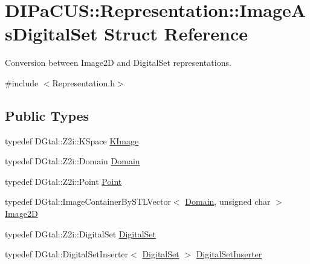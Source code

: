 \hypertarget{structDIPaCUS_1_1Representation_1_1ImageAsDigitalSet}{}\section{D\+I\+Pa\+C\+US\+:\+:Representation\+:\+:Image\+As\+Digital\+Set Struct Reference}
\label{structDIPaCUS_1_1Representation_1_1ImageAsDigitalSet}


Conversion between Image2D and Digital\+Set representations.  




{\ttfamily \#include $<$Representation.\+h$>$}

\subsection*{Public Types}
\begin{DoxyCompactItemize}
\item 
typedef D\+Gtal\+::\+Z2i\+::\+K\+Space \mbox{\hyperlink{structDIPaCUS_1_1Representation_1_1ImageAsDigitalSet_afa81bc0256169e31c499fa6e44f9f5bb}{K\+Image}}
\item 
typedef D\+Gtal\+::\+Z2i\+::\+Domain \mbox{\hyperlink{structDIPaCUS_1_1Representation_1_1ImageAsDigitalSet_acc30a7e7d3f45b546be17ca4d2961e0e}{Domain}}
\item 
typedef D\+Gtal\+::\+Z2i\+::\+Point \mbox{\hyperlink{structDIPaCUS_1_1Representation_1_1ImageAsDigitalSet_a16ad0b192ebf99b4d55bade91a62c847}{Point}}
\item 
typedef D\+Gtal\+::\+Image\+Container\+By\+S\+T\+L\+Vector$<$ \mbox{\hyperlink{structDIPaCUS_1_1Representation_1_1ImageAsDigitalSet_acc30a7e7d3f45b546be17ca4d2961e0e}{Domain}}, unsigned char $>$ \mbox{\hyperlink{structDIPaCUS_1_1Representation_1_1ImageAsDigitalSet_a594777514834a88dac93cac43b5e9324}{Image2D}}
\item 
typedef D\+Gtal\+::\+Z2i\+::\+Digital\+Set \mbox{\hyperlink{structDIPaCUS_1_1Representation_1_1ImageAsDigitalSet_a3a19b478392377afed24a5234dfdbd68}{Digital\+Set}}
\item 
typedef D\+Gtal\+::\+Digital\+Set\+Inserter$<$ \mbox{\hyperlink{structDIPaCUS_1_1Representation_1_1ImageAsDigitalSet_a3a19b478392377afed24a5234dfdbd68}{Digital\+Set}} $>$ \mbox{\hyperlink{structDIPaCUS_1_1Representation_1_1ImageAsDigitalSet_a81f59f774fe5b44575a6ffdf29e60ee8}{Digital\+Set\+Inserter}}
\end{DoxyCompactItemize}
